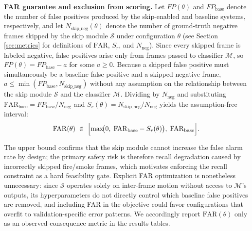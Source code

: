 \textbf{FAR guarantee and exclusion from scoring.}
Let $FP(\theta)$ and $FP_{\text{base}}$ denote the number of false positives
produced by the skip-enabled and baseline systems, respectively, and let
$N_{\text{skip\_neg}}(\theta)$ denote the number of ground-truth negative frames
skipped by the skip module $\mathcal{S}$ under configuration $\theta$ (see
    Section \ref{sec:metrics} for definitions of $\mathrm{FAR}$, $S_r$, and
$N_{\text{neg}}$). Since every skipped frame is labeled negative, false
positives arise only from frames passed to classifier $\mathcal{M}$, so
$FP(\theta) = FP_{\text{base}} - a$ for some $a \geq 0$. Because a skipped false
positive must simultaneously be a baseline false positive and a skipped negative
frame, $a \leq \min(FP_{\text{base}}, N_{\text{skip\_neg}})$ without any
assumption on the relationship between the skip module $\mathcal{S}$
and the classifier $\mathcal{M}$. Dividing
by $N_{\text{neg}}$ and substituting $\mathrm{FAR}_{\text{base}} =
FP_{\text{base}}/N_{\text{neg}}$ and $S_r(\theta) =
N_{\text{skip\_neg}}/N_{\text{neg}}$ yields the assumption-free interval:
\begin{equation}\label{eq:far_interval}
    \mathrm{FAR}(\theta) \;\in\;
    \Bigl[\max\!\bigl(0,\;\mathrm{FAR}_{\text{base}} - S_r(\theta)\bigr),\;
    \mathrm{FAR}_{\text{base}}\Bigr].
\end{equation}

The upper bound confirms that the skip module cannot increase the false alarm
rate by design; the primary safety risk is therefore recall degradation caused
by incorrectly skipped fire/smoke frames, which motivates enforcing the recall
constraint as a hard feasibility gate. Explicit FAR optimization is nonetheless
unnecessary: since $\mathcal{S}$ operates solely on inter-frame motion without
access to $\mathcal{M}$'s outputs, its hyperparameters do not directly control
which baseline false positives are removed, and including FAR in the objective
could favor configurations that overfit to validation-specific error patterns.
We accordingly report $\mathrm{FAR}(\theta)$ only as an observed consequence
metric in the results tables.
